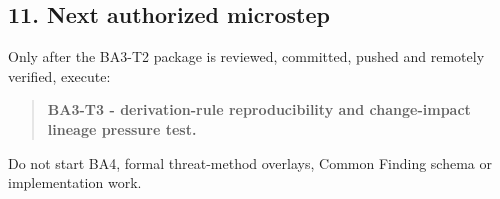 \documentclass[11pt,a4paper]{article}
\begin{document}
\subsection{11. Next authorized
microstep}\label{next-authorized-microstep}

Only after the BA3-T2 package is reviewed, committed, pushed and
remotely verified, execute:

\begin{quote}
\textbf{BA3-T3 - derivation-rule reproducibility and change-impact
lineage pressure test.}
\end{quote}

Do not start BA4, formal threat-method overlays, Common Finding schema
or implementation work.
\end{document}
